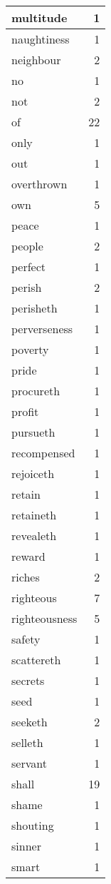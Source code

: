 \begin{center}
\begin{longtable}{l|r}
multitude & 1\\ \hline 
naughtiness & 1\\ \hline 
neighbour & 2\\ \hline 
no & 1\\ \hline 
not & 2\\ \hline 
of & 22\\ \hline 
only & 1\\ \hline 
out & 1\\ \hline 
overthrown & 1\\ \hline 
own & 5\\ \hline 
peace & 1\\ \hline 
people & 2\\ \hline 
perfect & 1\\ \hline 
perish & 2\\ \hline 
perisheth & 1\\ \hline 
perverseness & 1\\ \hline 
poverty & 1\\ \hline 
pride & 1\\ \hline 
procureth & 1\\ \hline 
profit & 1\\ \hline 
pursueth & 1\\ \hline 
recompensed & 1\\ \hline 
rejoiceth & 1\\ \hline 
retain & 1\\ \hline 
retaineth & 1\\ \hline 
revealeth & 1\\ \hline 
reward & 1\\ \hline 
riches & 2\\ \hline 
righteous & 7\\ \hline 
righteousness & 5\\ \hline 
safety & 1\\ \hline 
scattereth & 1\\ \hline 
secrets & 1\\ \hline 
seed & 1\\ \hline 
seeketh & 2\\ \hline 
selleth & 1\\ \hline 
servant & 1\\ \hline 
shall & 19\\ \hline 
shame & 1\\ \hline 
shouting & 1\\ \hline 
sinner & 1\\ \hline 
smart & 1\\ \hline 

\end{longtable}
\end{center}
